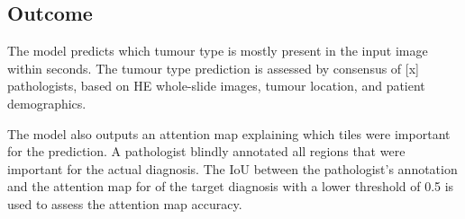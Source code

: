 \subsection{Outcome}

The model predicts which tumour type is mostly present in the input image within seconds.
The tumour type prediction is assessed by consensus of [x] pathologists, based on HE whole-slide images, tumour location, and patient demographics.

The model also outputs an attention map explaining which tiles were important for the prediction.
A pathologist blindly annotated all regions that were important for the actual diagnosis.
The IoU between the pathologist's annotation and the attention map for of the target diagnosis with a lower threshold of 0.5 is used to assess the attention map accuracy.
